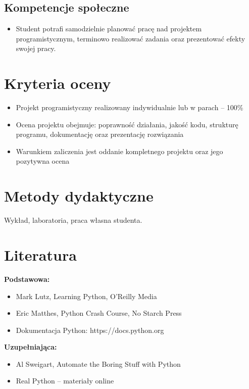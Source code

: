 \documentclass[12pt, a4paper]{article}
\begin{document}
\subsection*{Kompetencje społeczne}
\begin{itemize}
  \item Student potrafi samodzielnie planować pracę nad projektem programistycznym, terminowo realizować zadania oraz prezentować efekty swojej pracy.
\end{itemize}

\section{Kryteria oceny}

\begin{itemize}
  \item Projekt programistyczny realizowany indywidualnie lub w parach – 100\%
  \item Ocena projektu obejmuje: poprawność działania, jakość kodu, strukturę programu, dokumentację oraz prezentację rozwiązania
  \item Warunkiem zaliczenia jest oddanie kompletnego projektu oraz jego pozytywna ocena
\end{itemize}

\section{Metody dydaktyczne}

Wykład, laboratoria, praca własna studenta.

\section{Literatura}

\textbf{Podstawowa:}
\begin{itemize}
  \item Mark Lutz, Learning Python, O'Reilly Media
  \item Eric Matthes, Python Crash Course, No Starch Press
  \item Dokumentacja Python: https://docs.python.org
\end{itemize}

\textbf{Uzupełniająca:}
\begin{itemize}
  \item Al Sweigart, Automate the Boring Stuff with Python
  \item Real Python – materiały online
\end{itemize}
\end{document}
